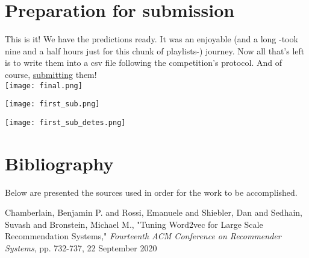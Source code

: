 \documentclass[]{article}
\begin{document}
\section{Preparation for submission}
This is it! We have the predictions ready. It was an enjoyable (and a long -took nine and a half hours just for this chunk of playlists-) journey. Now all that's left is to write them into a csv file following the competition's protocol. And of course, \href{https://www.aicrowd.com/9f000fa0-61d6-438f-9df7-62a205a3ef6c}{submitting} them!
\\
\texttt{[image: final.png]}

\texttt{[image: first\_sub.png]}

\texttt{[image: first\_sub\_detes.png]}

\section[papers used for research]{Bibliography}
Below are presented the sources used in order for the work to be accomplished.
\begin{thebibliography}{100}
	
	 Chamberlain, Benjamin P. and Rossi, Emanuele and Shiebler, Dan and Sedhain, Suvash and Bronstein, Michael M., "Tuning Word2vec for Large Scale Recommendation Systems," \emph{Fourteenth ACM Conference on Recommender Systems}, pp. 732-737, 22 September 2020  
\end{thebibliography}
\end{document}
